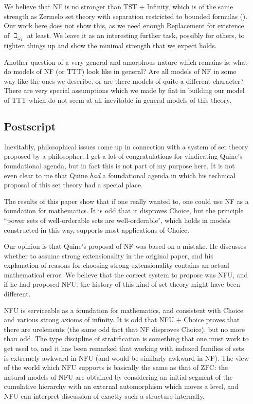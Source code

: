 \documentclass[112pt]{article}
\theoremstyle{definition}
\theoremstyle{remark}
\newcommand{\rk}[1]{{\color{blue}\sl #1}}
\begin{document}
We believe that NF is no stronger than TST + Infinity, which is of the same strength as Zermelo set theory with separation restricted to bounded formulas (\cite{kemeny}).  Our work here does not show this, as we need enough Replacement for
existence of $\beth_{\omega_1}$ at least.  We leave it as an interesting further task, possibly for others, to tighten things up and show the minimal strength that we expect holds.

Another question of a very general and amorphous nature which remains is:  what do models of NF (or TTT) look like in general?  Are all models of NF in some way like the ones we describe, or are there models of quite a different character?  There are very special assumptions which we made by fiat in building our model of TTT which do  not seem at all inevitable in general models of this theory.

\subsection{Postscript}

Inevitably, philosophical issues come up in connection with a system of set theory proposed by a philosopher.  I get a lot of congratulations for vindicating Quine's foundational agenda, but in fact this is not part of my purpose here.  It is not even clear to me that Quine {\em had\/} a foundational agenda in which his technical proposal of this set theory had a special place.

The results of this paper show that if one really wanted to, one could use NF as a foundation for mathematics.  It is odd that it disproves Choice, but the principle ``power sets of well-orderable sets are well-orderable", which holds in models constructed in this way, supports most applications of Choice.

Our opinion is that Quine's proposal of NF was based on a mistake.  He discusses whether to assume strong extensionality in the original paper, and his explanation of reasons for choosing strong extensionality contains an actual mathematical error.  %
We believe that the correct system to propose was NFU, and if he had proposed NFU, the history of this kind of set theory might have been different.

NFU is serviceable as a foundation for mathematics, and consistent with Choice and various strong axioms of infinity.  It is odd that NFU + Choice proves that there are urelements (the same odd fact that NF disproves Choice), but no more than odd.
The type discipline of stratification is something that one must work to get used to, and it has been remarked that working with indexed families of sets is extremely awkward in NFU (and would be similarly awkward in NF).  The view of the world which NFU supports is basically the same as that of ZFC:  the natural models of NFU are obtained by considering an initial segment of the cumulative hierarchy with an external automorphism which moves a level, and NFU can interpret discussion of exactly such a structure internally.
\end{document}
